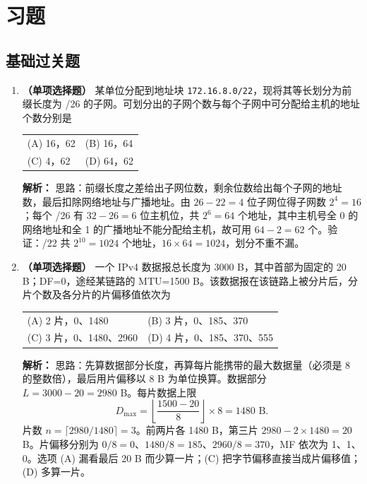 \section{习题}

\subsection{基础过关题}

\begin{enumerate}

\item \textbf{（单项选择题）} 某单位分配到地址块 \texttt{172.16.8.0/22}，现将其等长划分为前缀长度为 /26 的子网。可划分出的子网个数与每个子网中可分配给主机的地址个数分别是
\begin{center}
\begin{tabular}{ll}
(A) 16，62 & (B) 16，64 \\[4pt]
(C) 4，62 & (D) 64，62
\end{tabular}
\end{center}

\ifshowsolutions\par\noindent\textbf{解析：} 思路：前缀长度之差给出子网位数，剩余位数给出每个子网的地址数，最后扣除网络地址与广播地址。由 $26-22=4$ 位子网位得子网数 $2^4=16$；每个 /26 有 $32-26=6$ 位主机位，共 $2^6=64$ 个地址，其中主机号全 0 的网络地址和全 1 的广播地址不能分配给主机，故可用 $64-2=62$ 个。验证：/22 共 $2^{10}=1024$ 个地址，$16\times64=1024$，划分不重不漏。\else \answerarea \fi

\item \textbf{（单项选择题）} 一个 IPv4 数据报总长度为 3000 B，其中首部为固定的 20 B；DF=0，途经某链路的 MTU=1500 B。该数据报在该链路上被分片后，分片个数及各分片的片偏移值依次为
\begin{center}
\begin{tabular}{ll}
(A) 2 片，0、1480 & (B) 3 片，0、185、370 \\[4pt]
(C) 3 片，0、1480、2960 & (D) 4 片，0、185、370、555
\end{tabular}
\end{center}

\ifshowsolutions\par\noindent\textbf{解析：} 思路：先算数据部分长度，再算每片能携带的最大数据量（必须是 8 的整数倍），最后用片偏移以 8 B 为单位换算。数据部分 $L=3000-20=2980$ B。每片数据上限
\[
D_{\max}=\left\lfloor\frac{1500-20}{8}\right\rfloor\times8=1480\text{ B}.
\]
片数 $n=\lceil 2980/1480\rceil=3$。前两片各 1480 B，第三片 $2980-2\times1480=20$ B。片偏移分别为 $0/8=0$、$1480/8=185$、$2960/8=370$，MF 依次为 1、1、0。选项 (A) 漏看最后 20 B 而少算一片；(C) 把字节偏移直接当成片偏移值；(D) 多算一片。\else \answerarea \fi


\end{enumerate}
